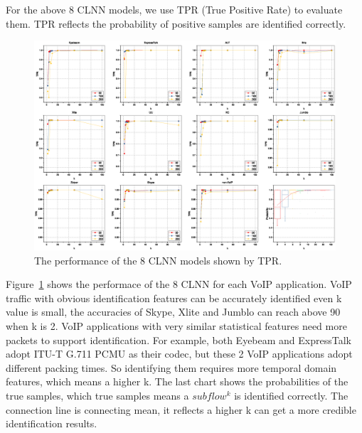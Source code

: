 \documentclass[conference]{IEEEtran}
\begin{document}
For the above 8 CLNN models, we use TPR (True Positive Rate) to evaluate them. TPR reflects the probability of positive samples are identified correctly.

\begin{figure}[htp]
\begin{center}
\includegraphics[width=1\textwidth]{clnn-batch.eps}
\caption{The performance of the 8 CLNN models shown by TPR.}\label{fig:fprtpr}
\end{center}
\end{figure}

Figure~\ref{fig:fprtpr} shows the performace of the 8 CLNN for each VoIP application. VoIP traffic with obvious identification features can be accurately identified even k value is small, the accuracies of Skype, Xlite and Jumblo can reach above 90 when k is 2. VoIP applications with very similar statistical features need more packets to support identification. For example, both Eyebeam and ExpressTalk adopt ITU-T G.711 PCMU as their codec, but these 2 VoIP applications adopt different packing times. So identifying them requires more temporal domain features, which means a higher k. The last chart shows the probabilities of the true samples, which true samples means a $subflow^k$ is identified correctly. The connection line is connecting mean, it reflects a higher k can get a more credible identification results.
\end{document}
